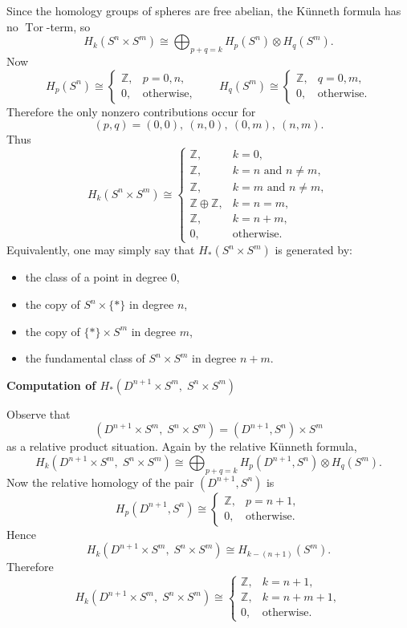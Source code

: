 \begin{solution}
Since the homology groups of spheres are free abelian, the K\"unneth formula has no \(\operatorname{Tor}\)-term, so
\[
H_k(S^n \times S^m)
\cong
\bigoplus_{p+q=k} H_p(S^n)\otimes H_q(S^m).
\]
Now
\[
H_p(S^n)\cong
\begin{cases}
	\mathbb Z, & p=0,n,\\
	0, & \text{otherwise},
\end{cases}
\qquad
H_q(S^m)\cong
\begin{cases}
	\mathbb Z, & q=0,m,\\
	0, & \text{otherwise}.
\end{cases}
\]
Therefore the only nonzero contributions occur for
\[
(p,q)=(0,0),\ (n,0),\ (0,m),\ (n,m).
\]
Thus
\[
H_k(S^n \times S^m)\cong
\begin{cases}
	\mathbb Z, & k=0,\\[1mm]
	\mathbb Z, & k=n \text{ and } n\neq m,\\[1mm]
	\mathbb Z, & k=m \text{ and } n\neq m,\\[1mm]
	\mathbb Z\oplus \mathbb Z, & k=n=m,\\[1mm]
	\mathbb Z, & k=n+m,\\[1mm]
	0, & \text{otherwise}.
\end{cases}
\]
Equivalently, one may simply say that \(H_*(S^n \times S^m)\) is generated by:
\begin{itemize}
	\item the class of a point in degree \(0\),
	\item the copy of \(S^n \times \{\ast\}\) in degree \(n\),
	\item the copy of \(\{\ast\} \times S^m\) in degree \(m\),
	\item the fundamental class of \(S^n \times S^m\) in degree \(n+m\).
\end{itemize}


\medskip
\noindent\textbf{Computation of \(H_*(D^{n+1} \times S^m,\; S^n \times S^m)\)}\par
\smallskip


Observe that
\[
(D^{n+1} \times S^m,\; S^n \times S^m)
=
(D^{n+1},S^n)\times S^m
\]
as a relative product situation. Again by the relative K\"unneth formula,
\[
H_k(D^{n+1} \times S^m,\; S^n \times S^m)
\cong
\bigoplus_{p+q=k} H_p(D^{n+1},S^n)\otimes H_q(S^m).
\]
Now the relative homology of the pair \((D^{n+1},S^n)\) is
\[
H_p(D^{n+1},S^n)\cong
\begin{cases}
	\mathbb Z, & p=n+1,\\
	0, & \text{otherwise}.
\end{cases}
\]
Hence
\[
H_k(D^{n+1} \times S^m,\; S^n \times S^m)
\cong
H_{k-(n+1)}(S^m).
\]
Therefore
\[
H_k(D^{n+1} \times S^m,\; S^n \times S^m)
\cong
\begin{cases}
	\mathbb Z, & k=n+1,\\[1mm]
	\mathbb Z, & k=n+m+1,\\[1mm]
	0, & \text{otherwise}.
\end{cases}
\]



\end{solution}
